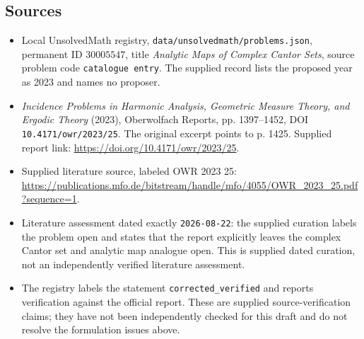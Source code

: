 \documentclass[11pt]{article}
\begin{document}
\subsection{Sources}
\begin{itemize}
\item Local UnsolvedMath registry, \texttt{data/unsolvedmath/problems.json}, permanent ID \(30005547\), title \emph{Analytic Maps of Complex Cantor Sets}, source problem code \texttt{catalogue entry}. The supplied record lists the proposed year as 2023 and names no proposer.
\item \emph{Incidence Problems in Harmonic Analysis, Geometric Measure Theory, and Ergodic Theory} (2023), Oberwolfach Reports, pp. 1397--1452, DOI \texttt{10.4171/owr/2023/25}. The original excerpt points to p. 1425. Supplied report link: \url{https://doi.org/10.4171/owr/2023/25}.
\item Supplied literature source, labeled OWR 2023 25: \url{https://publications.mfo.de/bitstream/handle/mfo/4055/OWR_2023_25.pdf?sequence=1}.
\item Literature assessment dated exactly \texttt{2026-08-22}: the supplied curation labels the problem open and states that the report explicitly leaves the complex Cantor set and analytic map analogue open. This is supplied dated curation, not an independently verified literature assessment.
\item The registry labels the statement \texttt{corrected\_verified} and reports verification against the official report. These are supplied source-verification claims; they have not been independently checked for this draft and do not resolve the formulation issues above.
\end{itemize}
\end{document}
